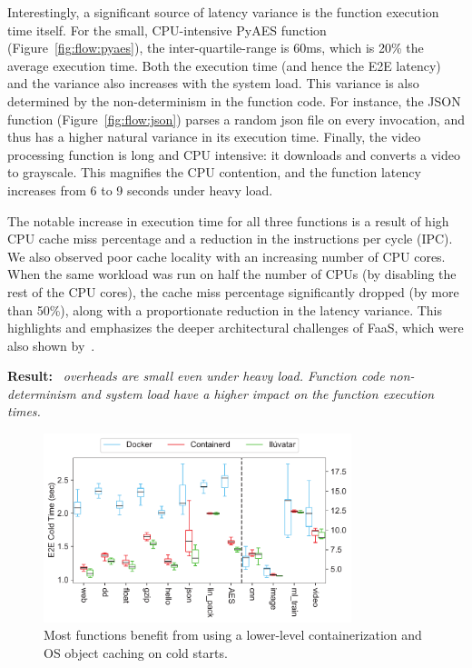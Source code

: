Interestingly, a significant source of latency variance is the function execution time itself. 
For the small, CPU-intensive PyAES function (Figure~\ref{fig:flow:pyaes}), the  inter-quartile-range is 60ms, which is 20\% the average execution time.
Both the execution time (and hence the E2E latency) and the variance also increases with the system load.
%
This variance is also determined by the non-determinism in the function code.
For instance, the JSON function (Figure~\ref{fig:flow:json}) parses a random json file on every invocation, and thus has a higher natural variance in its execution time.
%
Finally, the video processing function is long and CPU intensive: it downloads and converts a video to grayscale. 
This magnifies the CPU contention, and the function latency increases from 6 to 9 seconds under heavy load.
%


The notable increase in execution time for all three functions is a result of  high  CPU cache miss percentage and a reduction in the instructions per cycle (IPC).
%
We also observed poor cache locality with an increasing number of CPU cores. When the same workload was run on half the number of CPUs (by disabling the rest of the CPU cores), the cache miss percentage significantly dropped (by more than 50\%), along with a proportionate reduction in the latency variance.
%
This highlights and emphasizes the deeper architectural challenges of FaaS, which were also shown by~\cite{shahrad_architectural_2019}. 

\noindent \textbf{Result:} \emph{\sysname~overheads are small even under heavy load. Function code non-determinism and system load have a higher impact on the function execution times. }



\begin{figure}
  \centering
  \includegraphics[width=0.8\textwidth]{iluvatar/graphs/impl/benchmark_cold_e2e.pdf}
  \caption{Most functions benefit from using a lower-level containerization and OS object caching on cold starts.}
  \label{fig:cold}
\end{figure}

